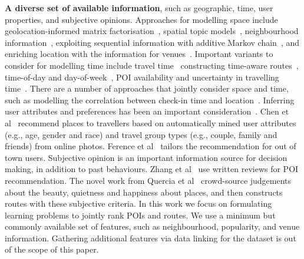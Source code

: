 {\bf A diverse set of available information}, 
such as geographic, time, user properties, and subjective opinions. 
Approaches for modelling space include geolocation-informed matrix factorisation~\cite{lian2014geomf}, spatial topic models~\cite{hu2013spatialtopic}, neighbourhood information~\cite{liu2014exploiting}, exploiting sequential information with additive Markov chain~\cite{zhang2014lore}, and enriching location with the information for venues~\cite{deveaud2014importance,deveaud2015experiments}.
Important variants to consider for modelling time include travel time~\cite{gao2013temporal}
constructing time-aware routes~\cite{yuan2013timeaware,hsieh2014mining}, time-of-day and day-of-week~\cite{chen2015tripplanner}, POI availability and uncertainty in travelling time~\cite{zhang2015personalized}. There are a number of approaches that jointly consider space and time\cite{yuan2014graph,zhang2015location}, such as modelling the correlation between check-in time and location~\cite{gao2013temporal}. 
Inferring user attributes and preferences has been an important consideration~\cite{liu2013personalized}. 
Chen et al~\cite{chen2013people} recommend places to travellers based on automatically mined user attributes 
(e.g., age, gender and race) and travel group types (e.g., couple, family and friends) from online photos.
Ference et al~\cite{ference2013location} tailors the recommendation for out of town users.
Subjective opinion is an important information source for decision making, in addition to past behaviours. Zhang et al~\cite{Zhang2015OOP} use written reviews for POI recommendation.  
The novel work from Quercia et al~\cite{ht14} crowd-source judgements about the beauty, quietness and happiness about places, and then constructs routes with these subjective criteria. 
In this work we focus on formulating learning problems to jointly rank POIs and routes. We use a minimum but commonly available set of features, such as neighbourhood, popularity, and venue information. Gathering additional features via data linking for the dataset is out of the scope of this paper. 

